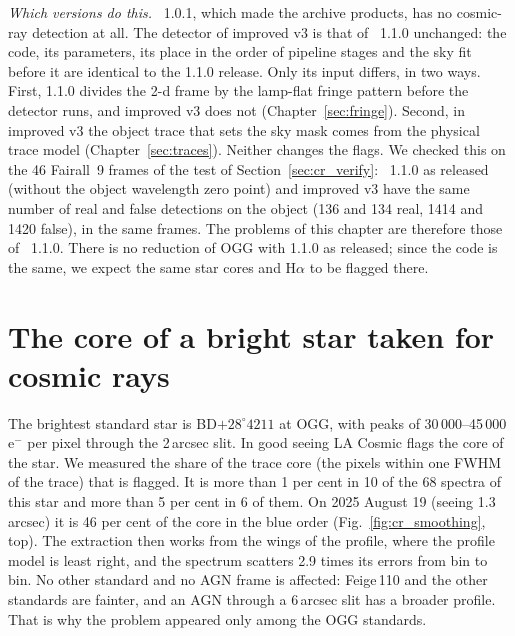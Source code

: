 \textit{Which versions do this.} \banzai{}~1.0.1, which made the archive products, has no cosmic-ray detection at all.
The detector of improved v3 is that of \banzai{}~1.1.0 unchanged: the code, its parameters, its place in the order of
pipeline stages and the sky fit before it are identical to the 1.1.0 release. Only its input differs, in two ways.
First, 1.1.0 divides the 2-d frame by the lamp-flat fringe pattern before the detector runs, and improved v3 does not
(Chapter~\ref{sec:fringe}). Second, in improved v3 the object trace that sets the sky mask comes from the physical
trace model (Chapter~\ref{sec:traces}). Neither changes the flags. We checked this on the 46 Fairall~9 frames of the
test of Section~\ref{sec:cr_verify}: \banzai{}~1.1.0 as released (without the object wavelength zero point) and
improved v3 have the same number of real and false detections on the object (136 and 134 real, 1414 and 1420 false),
in the same frames. The problems of this chapter are therefore those of \banzai{}~1.1.0. There is no reduction of OGG
with 1.1.0 as released; since the code is the same, we expect the same star cores and H$\alpha$ to be flagged there.

\section{The core of a bright star taken for cosmic rays}
\label{sec:cr_stars}
The brightest standard star is BD$+28^\circ4211$ at OGG, with peaks of 30\,000--45\,000\,e$^-$ per pixel through the
2\,arcsec slit. In good seeing LA Cosmic flags the core of the star. We measured the share of the trace core (the
pixels within one FWHM of the trace) that is flagged. It is more than 1 per cent in 10 of the 68 spectra of this star
and more than 5 per cent in 6 of them. On 2025 August 19 (seeing 1.3\,arcsec) it is 46 per cent of the core in the blue
order (Fig.~\ref{fig:cr_smoothing}, top). The extraction then works from the wings of the profile, where the profile
model is least right, and the spectrum scatters 2.9 times its errors from bin to bin. No other standard and no AGN frame
is affected: Feige\,110 and the other standards are fainter, and an AGN through a 6\,arcsec slit has a broader profile.
That is why the problem appeared only among the OGG standards.

